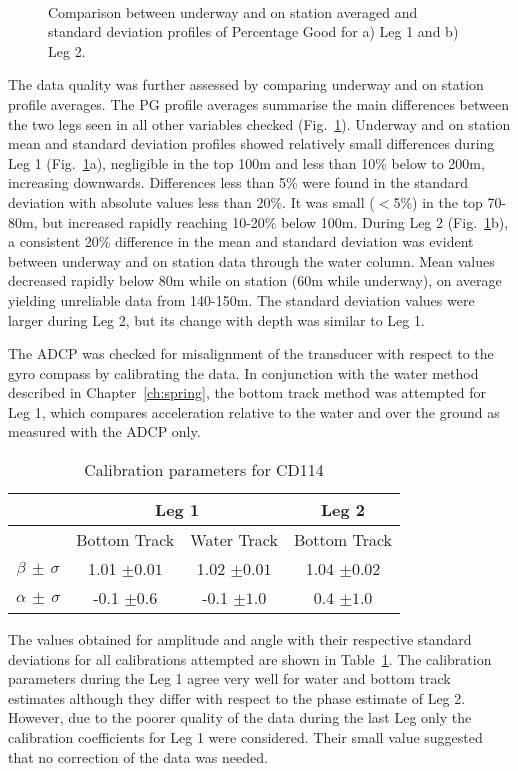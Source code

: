 \begin{figure}
\centering {}\\
\caption{Comparison between underway and on station averaged and
standard deviation profiles of Percentage Good for a) Leg 1 and b)
Leg 2.} \label{fig:cd114quality}
\end{figure}

The data quality was further assessed by comparing underway and on
station profile averages. The PG profile averages summarise the
main differences between the two legs seen in all other variables
checked (Fig.~\ref{fig:cd114quality}). Underway and on station
mean and standard deviation profiles showed relatively small
differences during Leg 1 (Fig.~\ref{fig:cd114quality}a),
negligible in the top 100m and less than 10\% below to 200m,
increasing downwards. Differences less than 5\% were found in the
standard deviation with absolute values less than 20\%. It was
small ($<$5\%) in the top 70-80m, but increased rapidly reaching
10-20\% below 100m. During Leg 2 (Fig.~\ref{fig:cd114quality}b), a
consistent 20\% difference in the mean and standard deviation was
evident between underway and on station data through the water
column. Mean values decreased rapidly below 80m while on station
(60m while underway), on average yielding unreliable data from
140-150m. The standard deviation values were larger during Leg 2,
but its change with depth was similar to Leg 1.

The ADCP was checked for misalignment of the transducer with
respect to the gyro compass by calibrating the data. In
conjunction with the water method described in
Chapter~\ref{ch:spring}, the bottom track method was attempted for
Leg 1, which compares acceleration relative to the water and over
the ground as measured with the ADCP only.
\begin{table}
  \centering
\begin{tabular}{cccc}
\hline \hline & \multicolumn{2}{c}{Leg 1} & Leg 2 \\ \hline &
\multicolumn{1}{c}{Bottom Track} & \multicolumn{1}{c}{Water
Track} & \multicolumn{1}{c}{Bottom Track}\\
$\beta \, \pm \, \sigma$ & 1.01 $\pm 0.01$ & 1.02 $\pm 0.01$ &
 1.04 $\pm 0.02$ \\
$\alpha \, \pm \, \sigma$ & -0.1 $\pm 0.6$ & -0.1 $\pm 1.0$ &
0.4 $\pm 1.0$\\
\hline \hline
\end{tabular}
  \caption{Calibration parameters for CD114}\label{tb:cd114cal}
\end{table}
The values obtained for amplitude and angle with their respective
standard deviations for all calibrations attempted are shown in
Table~\ref{tb:cd114cal}.  The calibration parameters during the
Leg 1 agree very well for water and bottom track estimates
although they differ with respect to the phase estimate of Leg 2.
However, due to the poorer quality of the data during the last Leg
only the calibration coefficients for Leg 1 were considered. Their
small value suggested that no correction of the data was needed.

